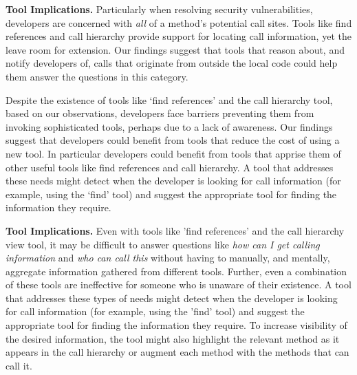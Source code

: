 \documentclass[conference]{IEEEtran}
\begin{document}

\noindent\textbf{Tool Implications.}
Particularly when resolving security vulnerabilities, developers are concerned with \textit{all} of a method's potential call sites.
Tools like find references and call hierarchy provide support for locating call information, yet the leave room for extension.
Our findings suggest that tools that reason about, and notify developers of, calls that originate from outside the local code could help them answer the questions in this category.

Despite the existence of tools like `find references' and the call hierarchy tool, based on our observations, developers face barriers preventing them from invoking sophisticated tools, perhaps due to a lack of awareness.
Our findings suggest that developers could benefit from tools that reduce the cost of using a new tool.
In particular developers could benefit from tools that apprise them of other useful tools like find references and call hierarchy.
A tool that addresses these needs might detect when the developer is looking for call information (for example, using the `find' tool) and suggest the appropriate tool for finding the information they require. 

\noindent\textbf{Tool Implications.}
Even with tools like 'find references' and the call hierarchy view tool, it may be difficult to answer questions like \emph{how can I get calling information} and \emph{who can call this} without having to manually, and mentally, aggregate information gathered from different tools. 
Further, even a combination of these tools are ineffective for someone who is unaware of their existence.
A tool that addresses these types of needs might detect when the developer is looking for call information (for example, using the 'find' tool) and suggest the appropriate tool for finding the information they require. 
To increase visibility of the desired information, the tool might also highlight the relevant method as it appears in the call hierarchy or augment each method with the methods that can call it.
\end{document}
